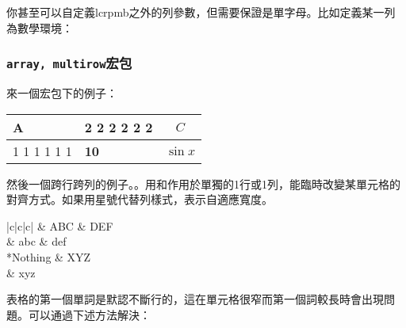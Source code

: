 你甚至可以自定義lcrpmb之外的列參數，但需要保證是單字母。比如定義某一列為數學環境：
\begin{latex}
\end{latex}

\subsubsection{\texttt{array, multirow}宏包}
來一個宏包下的例子：
\begin{codeshow}
\begin{tabular}{|>{\setlength
  \parindent{5mm}}m{1cm}|
  >{\large\bfseries}m{1.5cm}|
  >{$}c<{$}|}
  \hline A & 2 2 2 2 2 2 & C\\
  \hline 1 1 1 1 1 1  & 10 & \sin x \\ \hline
\end{tabular}
\end{codeshow}

然後一個跨行跨列的例子。。用和作用於單獨的1行或1列，能臨時改變某單元格的對齊方式。如果用星號代替列樣式，表示自適應寬度。

\begin{codeshow}
\begin{center}
\begin{tabular}{|c|c|c|}
  \hline
    & ABC & DEF \\
   & abc & def \\
  \hline
    {*{Nothing}} & XYZ \\
   & xyz \\
  \hline
\end{tabular}
\end{center}
\end{codeshow}

表格的第一個單詞是默認不斷行的，這在單元格很窄而第一個詞較長時會出現問題。可以通過下述方法解決：


